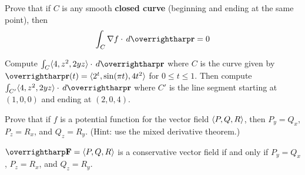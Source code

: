 \documentclass[letterpaper, twoside, 12pt]{book}
\begin{document}
          \begin{problem}
            Prove that if $C$ is any smooth \textbf{closed curve}
            (beginning and ending at the same point), then
            \[
              \int_C \nabla f\cdot \dvar{\vect{r}} = 0
            \]
          \end{problem}

          \begin{solution}

          \end{solution}

          \begin{contributors}

          \end{contributors}

          \begin{problem}
            Compute $\int_C\<4,z^2,2yz\>\cdot\dvar{\vect r}$ where
            $C$ is the curve given by
            $\vect{r}(t)=\<2^t,\sin (\pi t),4t^2\>$ for $0\leq t\leq 1$.
            Then compute $\int_{C'}\<4,z^2,2yz\>\cdot\dvar{\vect r}$ where
            $C'$ is the line segment starting at $(1,0,0)$ and ending
            at $(2,0,4)$.
          \end{problem}

          \begin{solution}

          \end{solution}

          \begin{contributors}

          \end{contributors}

          \begin{problem}
            Prove that if $f$ is a potential function for the vector field
            $\langle P,Q,R\rangle$, then
            $P_y=Q_x$, $P_z=R_x$, and $Q_z=R_y$. (Hint: use the mixed derivative
            theorem.)
          \end{problem}

          \begin{solution}

          \end{solution}

          \begin{contributors}

          \end{contributors}

\begin{theorem}
  $\vect{F}=\<P,Q,R\>$ is a conservative vector field if and only if
  $P_y=Q_x$, $P_z=R_x$, and $Q_z=R_y$.
\end{theorem}
\end{document}
